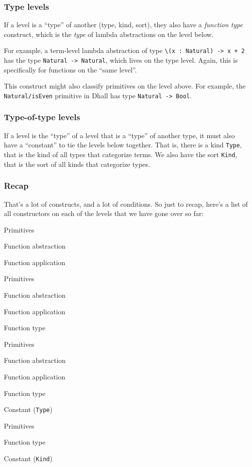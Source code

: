 \documentclass[]{article}
\begin{document}
\hypertarget{type-levels}{%
\subsubsection{Type levels}\label{type-levels}}

If a level is a ``type'' of another (type, kind, sort), they also have a
\emph{function type} construct, which is the \emph{type} of lambda abstractions
on the level below.

For example, a term-level lambda abstraction of type
\texttt{\textbackslash{}(x\ :\ Natural)\ -\textgreater{}\ x\ +\ 2} has the type
\texttt{Natural\ -\textgreater{}\ Natural}, which lives on the type level.
Again, this is specifically for functions on the ``same level''.

This construct might also classify primitives on the level above. For example,
the \texttt{Natural/isEven} primitive in Dhall has type
\texttt{Natural\ -\textgreater{}\ Bool}.

\hypertarget{type-of-type-levels}{%
\subsubsection{Type-of-type levels}\label{type-of-type-levels}}

If a level is the ``type'' of a level that is a ``type'' of another type, it
must also have a ``constant'' to tie the levels below together. That is, there
is a kind \texttt{Type}, that is the kind of all types that categorize terms. We
also have the sort \texttt{Kind}, that is the sort of all kinds that categorize
types.

\hypertarget{recap}{%
\subsubsection{Recap}\label{recap}}

That's a lot of constructs, and a lot of conditions. So just to recap, here's a
list of all constructors on each of the levels that we have gone over so far:

\begin{description}
\tightlist
\item[Term]
Primitives

Function abstraction

Function application
\item[Type]
Primitives

Function abstraction

Function application

Function type
\item[Kind]
Primitives

Function abstraction

Function application

Function type

Constant (\texttt{Type})
\item[Sort]
Primitives

Function type

Constant (\texttt{Kind})
\end{description}
\end{document}
